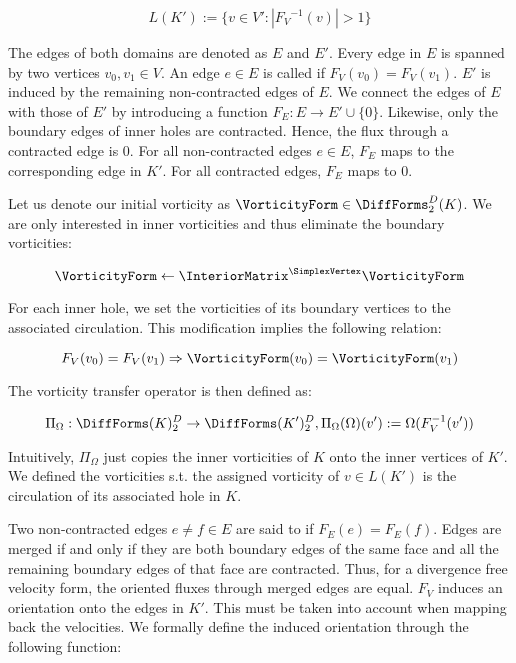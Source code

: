 \begin{equation}
L(K') := \{ v \in V' : | {F_V}^{-1}(v) | > 1 \}
\end{equation}

The edges of both domains are denoted as $E$ and $E'$. 
Every edge in $E$ is spanned by two vertices $v_0, v_1 \in V$.
An edge $e \in E$ is called  if $F_V(v_0) = F_V(v_1)$.
$E'$ is induced by the remaining non-contracted edges of $E$.
We connect the edges of $E$ with those of $E'$ by introducing a function
$F_E : E \rightarrow E' \cup \{0\}$. 
Likewise, only the boundary edges of inner holes are contracted.
Hence, the flux through a contracted edge is $0$.
For all non-contracted edges $e \in E$, $F_E$ maps to the corresponding edge in $K'$.
For all contracted edges, $F_E$ maps to $0$.

Let us denote our initial vorticity as $\VorticityForm \in \DiffForms^D_2(K)$.
We are only interested in inner vorticities and thus eliminate the boundary vorticities:

\begin{equation}
\VorticityForm \leftarrow \InteriorMatrix^\SimplexVertex \VorticityForm
\end{equation}

For each inner hole, we set the vorticities of its boundary vertices to the associated circulation.
This modification implies the following relation:

\begin{equation}
F_V(v_0) = F_V(v_1) \Rightarrow \VorticityForm(v_0) = \VorticityForm(v_1)
\end{equation} 

The vorticity transfer operator is then defined as:

\begin{equation}
\Pi_\Omega : \DiffForms(K)^D_2 \rightarrow \DiffForms(K')^D_2, \Pi_\Omega( \Omega )(v') := \Omega( F_V^{-1}(v') )
\end{equation}

Intuitively, $\Pi_\Omega$ just copies the inner vorticities of $K$ onto the inner vertices of $K'$.
We defined the vorticities s.t. the assigned vorticity of $v \in L(K')$ is the circulation of its associated hole in $K$.

Two non-contracted edges $e \neq f \in E$ are said to  if $F_E(e) = F_E(f)$.
Edges are merged if and only if they are both boundary edges of the same face and all the remaining boundary edges of that face are contracted. 
Thus, for a divergence free velocity form, the oriented fluxes through merged edges are equal. 
$F_V$ induces an orientation onto the edges in $K'$.
This must be taken into account when mapping back the velocities.
We formally define the induced orientation through the following function:

